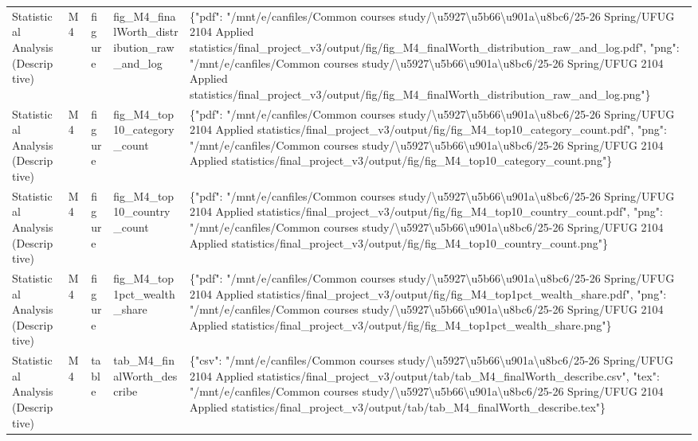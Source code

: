 \begin{tabular}{lllll}
Statistical Analysis (Descriptive) & M4 & figure & fig\_M4\_finalWorth\_distribution\_raw\_and\_log & \{"pdf": "/mnt/e/canfiles/Common courses study/\textbackslash u5927\textbackslash u5b66\textbackslash u901a\textbackslash u8bc6/25-26 Spring/UFUG 2104 Applied statistics/final\_project\_v3/output/fig/fig\_M4\_finalWorth\_distribution\_raw\_and\_log.pdf", "png": "/mnt/e/canfiles/Common courses study/\textbackslash u5927\textbackslash u5b66\textbackslash u901a\textbackslash u8bc6/25-26 Spring/UFUG 2104 Applied statistics/final\_project\_v3/output/fig/fig\_M4\_finalWorth\_distribution\_raw\_and\_log.png"\} \\
Statistical Analysis (Descriptive) & M4 & figure & fig\_M4\_top10\_category\_count & \{"pdf": "/mnt/e/canfiles/Common courses study/\textbackslash u5927\textbackslash u5b66\textbackslash u901a\textbackslash u8bc6/25-26 Spring/UFUG 2104 Applied statistics/final\_project\_v3/output/fig/fig\_M4\_top10\_category\_count.pdf", "png": "/mnt/e/canfiles/Common courses study/\textbackslash u5927\textbackslash u5b66\textbackslash u901a\textbackslash u8bc6/25-26 Spring/UFUG 2104 Applied statistics/final\_project\_v3/output/fig/fig\_M4\_top10\_category\_count.png"\} \\
Statistical Analysis (Descriptive) & M4 & figure & fig\_M4\_top10\_country\_count & \{"pdf": "/mnt/e/canfiles/Common courses study/\textbackslash u5927\textbackslash u5b66\textbackslash u901a\textbackslash u8bc6/25-26 Spring/UFUG 2104 Applied statistics/final\_project\_v3/output/fig/fig\_M4\_top10\_country\_count.pdf", "png": "/mnt/e/canfiles/Common courses study/\textbackslash u5927\textbackslash u5b66\textbackslash u901a\textbackslash u8bc6/25-26 Spring/UFUG 2104 Applied statistics/final\_project\_v3/output/fig/fig\_M4\_top10\_country\_count.png"\} \\
Statistical Analysis (Descriptive) & M4 & figure & fig\_M4\_top1pct\_wealth\_share & \{"pdf": "/mnt/e/canfiles/Common courses study/\textbackslash u5927\textbackslash u5b66\textbackslash u901a\textbackslash u8bc6/25-26 Spring/UFUG 2104 Applied statistics/final\_project\_v3/output/fig/fig\_M4\_top1pct\_wealth\_share.pdf", "png": "/mnt/e/canfiles/Common courses study/\textbackslash u5927\textbackslash u5b66\textbackslash u901a\textbackslash u8bc6/25-26 Spring/UFUG 2104 Applied statistics/final\_project\_v3/output/fig/fig\_M4\_top1pct\_wealth\_share.png"\} \\
Statistical Analysis (Descriptive) & M4 & table & tab\_M4\_finalWorth\_describe & \{"csv": "/mnt/e/canfiles/Common courses study/\textbackslash u5927\textbackslash u5b66\textbackslash u901a\textbackslash u8bc6/25-26 Spring/UFUG 2104 Applied statistics/final\_project\_v3/output/tab/tab\_M4\_finalWorth\_describe.csv", "tex": "/mnt/e/canfiles/Common courses study/\textbackslash u5927\textbackslash u5b66\textbackslash u901a\textbackslash u8bc6/25-26 Spring/UFUG 2104 Applied statistics/final\_project\_v3/output/tab/tab\_M4\_finalWorth\_describe.tex"\} \\

\end{tabular}
